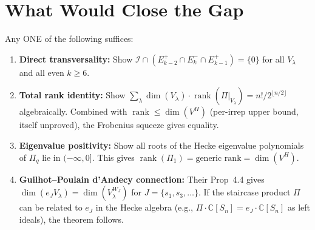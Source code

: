 \documentclass[11pt]{article}
\theoremstyle{definition}
\theoremstyle{remark}
\newcommand{\rank}{\operatorname{rank}}
\begin{document}
\section{What Would Close the Gap}

Any ONE of the following suffices:
\begin{enumerate}
\item \textbf{Direct transversality:} Show
$\mathcal{I} \cap (E_{k-2}^+ \cap E_k^- \cap E_{k-1}^+) = \{0\}$
for all $V_\lambda$ and all even $k \geq 6$.
\item \textbf{Total rank identity:} Show
$\sum_\lambda \dim(V_\lambda) \cdot \rank(\Pi|_{V_\lambda})
= n!/2^{\lfloor n/2 \rfloor}$
algebraically. Combined with $\rank \leq \dim(V^H)$ (per-irrep upper bound,
itself unproved), the Frobenius squeeze gives equality.
\item \textbf{Eigenvalue positivity:} Show all roots of the Hecke eigenvalue
polynomials of $\Pi_q$ lie in $(-\infty, 0]$. This gives
$\rank(\Pi_1) = \text{generic rank} = \dim(V^H)$.
\item \textbf{Guilhot--Poulain d'Andecy connection:} Their Prop~4.4 gives
$\dim(e_J V_\lambda) = \dim(V_\lambda^{W_J})$ for $J = \{s_1, s_3, \ldots\}$.
If the staircase product $\Pi$ can be related to $e_J$ in the Hecke algebra
(e.g., $\Pi \cdot \mathbb{C}[S_n] = e_J \cdot \mathbb{C}[S_n]$
as left ideals), the theorem follows.
\end{enumerate}
\end{document}

